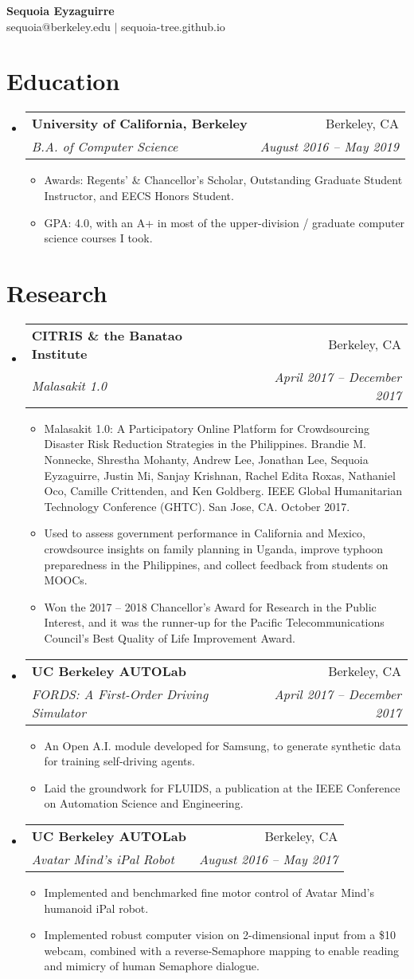 \documentclass[letterpaper, 11pt]{article}
\makeatletter
\newcommand{\cvItem}[4]{
\vspace{-1pt}
\item
\begin{tabular*}{0.97\textwidth}{l@{\extracolsep{\fill}}r}
    \textbf{#1} & #2\\
    \textit{\small#3} & \textit{\small #4}\\
\end{tabular*}
\vspace{-5pt}
}
\newcommand{\cvSubitem}[1]{
\item\small{#1 \vspace{-2pt}}
}
\newcommand{\cvItemStart}{\begin{itemize}[leftmargin=*]}
\newcommand{\cvItemEnd}{\end{itemize}}
\newcommand{\cvSubitemStart}{\begin{itemize}}
\newcommand{\cvSubitemEnd}{\end{itemize}\vspace{-5pt}}
\makeatother
\begin{document}

\begin{center}
\textbf{\LARGE Sequoia Eyzaguirre}\\
sequoia@berkeley.edu $\vert$ sequoia-tree.github.io
\end{center}


\section{Education}

\cvItemStart
\cvItem
{University of California, Berkeley}
{Berkeley, CA}
{B.A. of Computer Science}
{August 2016 -- May 2019}
\cvSubitemStart
\cvSubitem{
Awards: Regents' \& Chancellor's Scholar, Outstanding Graduate Student Instructor, and EECS Honors Student.
}
\cvSubitem{
GPA: 4.0, with an A+ in most of the upper-division / graduate computer science courses I took.
}
\cvSubitemEnd
\cvItemEnd


\section{Research}

\cvItemStart
\cvItem
{CITRIS \& the Banatao Institute}
{Berkeley, CA}
{Malasakit 1.0}
{April 2017 -- December 2017}
\cvSubitemStart
\cvSubitem{
Malasakit 1.0: A Participatory Online Platform for Crowdsourcing Disaster Risk Reduction Strategies in the Philippines. Brandie M. Nonnecke, Shrestha Mohanty, Andrew Lee, Jonathan Lee, Sequoia Eyzaguirre, Justin Mi, Sanjay Krishnan, Rachel Edita Roxas, Nathaniel Oco, Camille Crittenden, and Ken Goldberg. IEEE Global Humanitarian Technology Conference (GHTC). San Jose, CA. October 2017.
}
\cvSubitem{
Used to assess government performance in California and Mexico, crowdsource insights on family planning in Uganda, improve typhoon preparedness in the Philippines, and collect feedback from students on MOOCs.
}
\cvSubitem{
Won the 2017 -- 2018 Chancellor's Award for Research in the Public Interest, and it was the runner-up for the Pacific Telecommunications Council's Best Quality of Life Improvement Award.
}
\cvSubitemEnd
\cvItem
{UC Berkeley AUTOLab}
{Berkeley, CA}
{FORDS: A First-Order Driving Simulator}
{April 2017 -- December 2017}
\cvSubitemStart
\cvSubitem{
An Open A.I. module developed for Samsung, to generate synthetic data for training self-driving agents.
}
\cvSubitem{
Laid the groundwork for FLUIDS, a publication at the IEEE Conference on Automation Science and Engineering.
}
\cvSubitemEnd
\cvItem
{UC Berkeley AUTOLab}
{Berkeley, CA}
{Avatar Mind's iPal Robot}
{August 2016 -- May 2017}
\cvSubitemStart
\cvSubitem{
Implemented and benchmarked fine motor control of Avatar Mind's humanoid iPal robot.
}
\cvSubitem{
Implemented robust computer vision on 2-dimensional input from a \$10 webcam, combined with a reverse-Semaphore mapping to enable reading and mimicry of human Semaphore dialogue.
}
\cvSubitemEnd
\cvItemEnd
\end{document}
